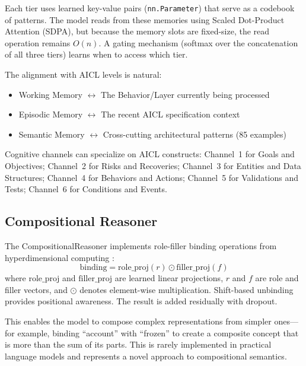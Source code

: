 \documentclass[11pt]{article}
\newcommand{\aicl}{\textsc{AICL}}
\begin{document}
Each tier uses learned key-value pairs (\texttt{nn.Parameter}) that serve as a codebook of patterns. The model reads from these memories using Scaled Dot-Product Attention (SDPA), but because the memory slots are fixed-size, the read operation remains $O(n)$. A gating mechanism (softmax over the concatenation of all three tiers) learns when to access which tier.

The alignment with \aicl{} levels is natural:
\begin{itemize}[leftmargin=*,itemsep=1pt]
  \item Working Memory $\leftrightarrow$ The Behavior/Layer currently being processed
  \item Episodic Memory $\leftrightarrow$ The recent \aicl{} specification context
  \item Semantic Memory $\leftrightarrow$ Cross-cutting architectural patterns (85 examples)
\end{itemize}

Cognitive channels can specialize on \aicl{} constructs: Channel~1 for Goals and Objectives; Channel~2 for Risks and Recoveries; Channel~3 for Entities and Data Structures; Channel~4 for Behaviors and Actions; Channel~5 for Validations and Tests; Channel~6 for Conditions and Events.

\subsection{Compositional Reasoner}
\label{sec:cognet:compositional}

The CompositionalReasoner implements role-filler binding operations from hyperdimensional computing \citep{kanerva2009hyperdimensional}:
\begin{equation}
  \text{binding} = \text{role\_proj}(r) \odot \text{filler\_proj}(f)
  \label{eq:binding}
\end{equation}
where $\text{role\_proj}$ and $\text{filler\_proj}$ are learned linear projections, $r$ and $f$ are role and filler vectors, and $\odot$ denotes element-wise multiplication. Shift-based unbinding provides positional awareness. The result is added residually with dropout.

This enables the model to compose complex representations from simpler ones---for example, binding ``account'' with ``frozen'' to create a composite concept that is more than the sum of its parts. This is rarely implemented in practical language models and represents a novel approach to compositional semantics.
\end{document}
